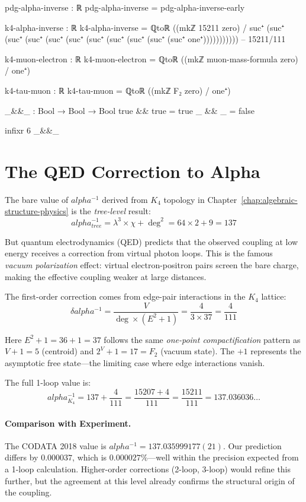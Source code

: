 \documentclass[11pt,a4paper]{book}
\def\alpha{alpha}%
\def\text#1{#1}%
\begin{document}
\begin{code}
pdg-alpha-inverse : ℝ
pdg-alpha-inverse = pdg-alpha-inverse-early

k4-alpha-inverse : ℝ
k4-alpha-inverse = ℚtoℝ ((mkℤ 15211 zero) / suc⁺ (suc⁺ (suc⁺ (suc⁺ (suc⁺ (suc⁺ (suc⁺ (suc⁺ (suc⁺ (suc⁺ (suc⁺ one⁺)))))))))))  -- 15211/111

k4-muon-electron : ℝ
k4-muon-electron = ℚtoℝ ((mkℤ muon-mass-formula zero) / one⁺)

k4-tau-muon : ℝ
k4-tau-muon = ℚtoℝ ((mkℤ F₂ zero) / one⁺)

_&&_ : Bool → Bool → Bool
true && true = true
_ && _ = false

infixr 6 _&&_
\end{code}

\section{The QED Correction to Alpha}

The bare value of $\alpha^{-1}$ derived from $K_4$ topology in Chapter~\ref{chap:algebraic-structure-physics} 
is the \emph{tree-level} result:
\[
\alpha^{-1}_{\text{tree}} = \lambda^3 \times \chi + \deg^2 = 64 \times 2 + 9 = 137
\]

But quantum electrodynamics (QED) predicts that the observed coupling at low energy receives 
a correction from virtual photon loops. This is the famous \emph{vacuum polarization} effect: 
virtual electron-positron pairs screen the bare charge, making the effective coupling weaker 
at large distances.

The first-order correction comes from edge-pair interactions in the $K_4$ lattice:
\[
\delta \alpha^{-1} = \frac{V}{\deg \times (E^2 + 1)} = \frac{4}{3 \times 37} = \frac{4}{111}
\]

Here $E^2 + 1 = 36 + 1 = 37$ follows the same \emph{one-point compactification} pattern as 
$V + 1 = 5$ (centroid) and $2^V + 1 = 17 = F_2$ (vacuum state). The $+1$ represents the 
asymptotic free state—the limiting case where edge interactions vanish.

The full 1-loop value is:
\[
\alpha^{-1}_{K_4} = 137 + \frac{4}{111} = \frac{15207 + 4}{111} = \frac{15211}{111} = 137.036036\ldots
\]

\paragraph{Comparison with Experiment.}
The CODATA 2018 value is $\alpha^{-1} = 137.035999177(21)$. Our prediction differs by 
$0.000037$, which is $0.000027\%$—well within the precision expected from a 1-loop 
calculation. Higher-order corrections (2-loop, 3-loop) would refine this further, but the 
agreement at this level already confirms the structural origin of the coupling.
\end{document}
